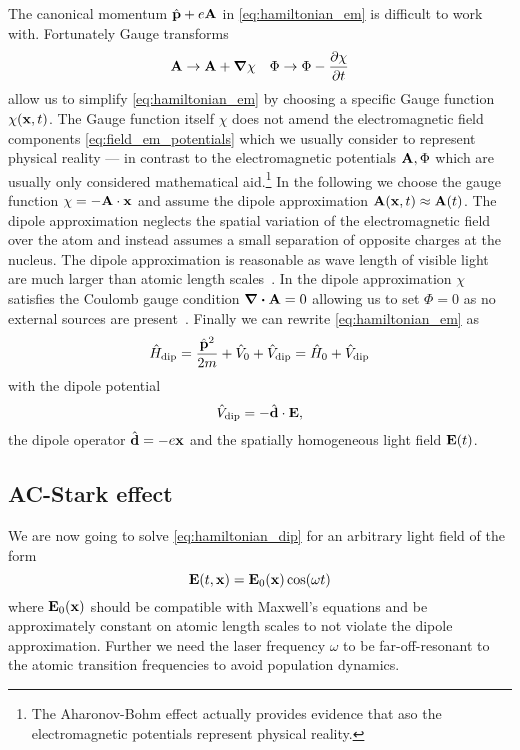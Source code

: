 The canonical momentum $\hat{\vb{p}}+e\vb{A}$ in \cref{eq:hamiltonian_em} is
difficult to work with. Fortunately Gauge transforms
\begin{align}
  \vb{A}\to\vb{A}+\grad{\chi}
  &&
  \Phi\to\Phi-\pdv{\chi}{t}
  \label{eq:gauge_transform_em}
\end{align}
allow us to simplify \cref{eq:hamiltonian_em} by choosing a specific Gauge
function $\chi(\vb{x},t)$. The Gauge function itself $\chi$ does not amend the
electromagnetic field components \cref{eq:field_em_potentials} which we
usually consider to represent physical reality --- in contrast to the
electromagnetic potentials $\vb{A},\Phi$ which are usually only considered
mathematical aid.\footnote{The Aharonov-Bohm effect actually provides evidence
that aso the electromagnetic potentials represent physical reality.} In the
following we choose the gauge function $\chi=-\vb{A}\cdot\vb{x}$ and assume
the dipole approximation $\vb{A}(\vb{x},t)\approx\vb{A}(t)$. The dipole
approximation neglects the spatial variation of the electromagnetic field
over the atom and instead assumes a small separation of opposite charges at
the nucleus. The dipole approximation is reasonable as wave length of visible
light are much larger than atomic length scales~\cite{Gerry2004}. In the dipole
approximation $\chi$ satisfies the Coulomb gauge condition
$\divergence{\vb{A}}=0$ allowing us to set $\Phi=0$ as no external sources are
present~\cite{Jackson2005}. Finally we can rewrite
\cref{eq:hamiltonian_em} as
\begin{equation}
  \hat{H}_\text{dip}
  =\frac{\hat{\vb{p}}^2}{2m}+\hat{V}_0+\hat{V}_\text{dip}
  =\hat{H}_0+\hat{V}_\text{dip}
  \label{eq:hamiltonian_dip}
\end{equation}
with the dipole potential
\begin{equation}
  \hat{V}_\text{dip}
  =-\hat{\vb{d}}\cdot\vb{E}
  \label{eq:potential_dip},
\end{equation}
the dipole operator $\hat{\vb{d}}=-e\vb{x}$ and the spatially homogeneous
light field $\vb{E}(t)$.

\subsection{AC-Stark effect}

We are now going to solve \cref{eq:hamiltonian_dip} for an arbitrary light
field of the form
\begin{equation}
  \vb{E}(t,\vb{x})
  =\vb{E}_0(\vb{x})\cos(\omega t)
  \label{eq:light_field}
\end{equation}
where $\vb{E}_0(\vb{x})$ should be compatible with Maxwell's equations and
be approximately constant on atomic length scales to not violate the dipole
approximation. Further we need the laser frequency $\omega$ to be
far-off-resonant to the atomic transition frequencies to avoid population
dynamics.

